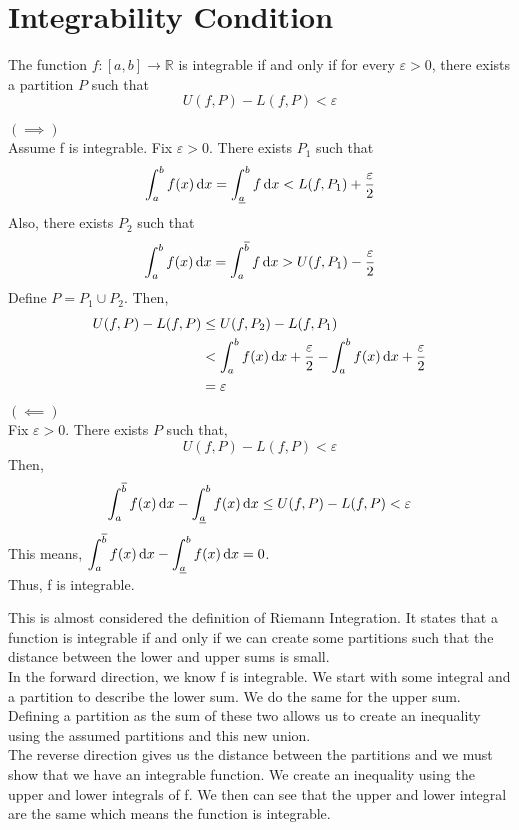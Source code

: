 \documentclass[12pt]{article}
\begin{document}
\section{Integrability Condition}
\begin{theo}{}
The function \(f:[a, b] \to \mathbb R\) is integrable if and only if for every \(\varepsilon > 0\), there exists a partition \(P\) such that \[U(f, P) - L(f, P) < \varepsilon\]
\end{theo}
\begin{prf}{}
\(\left(\implies\right)\)\\
Assume f is integrable. Fix \(\varepsilon > 0\). There exists \(P_1\) such that \[\displaystyle\int_a^b f(x)\,\mathrm{d} x = \displaystyle\int_{\underline{a}}^bf\,\mathrm{d} x < L(f, P_1) + \frac{\varepsilon}{2}\]
Also, there exists \(P_2\) such that 
\[\displaystyle\int_a^b f(x)\,\mathrm{d} x = \displaystyle\int_{a}^{\overline{b}}f\,\mathrm{d} x > U(f, P_1) - \frac{\varepsilon}{2}\]
Define \(P = P_1 \cup P_2\). Then,
\begin{align*}
    U(f, P) - L(f, P) &\le U(f, P_2) - L(f, P_1)\\
    &< \displaystyle\int_a^b f(x) \,\mathrm{d} x + \frac{\varepsilon}{2} - \displaystyle\int_a^b f(x)\,\mathrm{d} x + \frac{\varepsilon}{2}\\
    &= \varepsilon
\end{align*}
\(\left(\impliedby\right)\)\\
Fix \(\varepsilon > 0\). There exists \(P\) such that,
\[U(f, P) - L(f, P) < \varepsilon\]
Then, \[\displaystyle\int_a^{\overline{b}}f(x)\,\mathrm{d} x - \displaystyle\int_{\underline{a}}^bf(x)\,\mathrm{d} x \le U(f, P) - L(f, P) <  \varepsilon\]
This means, \(\displaystyle\int_a^{\overline{b}}f(x)\,\mathrm{d} x - \displaystyle\int_{\underline{a}}^bf(x)\,\mathrm{d} x = 0\).\\
Thus, f is integrable.
\end{prf}
\begin{explanation}{}
    This is almost considered the definition of Riemann Integration. It states that a function is integrable if and only if we can create some partitions such that the distance between the lower and upper sums is small.\\
    In the forward direction, we know f is integrable. We start with some integral and a partition to describe the lower sum. We do the same for the upper sum. Defining a partition as the sum of these two allows us to create an inequality using the assumed partitions and this new union.\\
    The reverse direction gives us the distance between the partitions and we must show that we have an integrable function. We create an inequality using the upper and lower integrals of f. We then can see that the upper and lower integral are the same which means the function is integrable.\\
\end{explanation}
\end{document}
